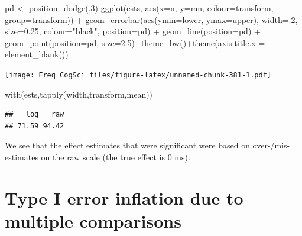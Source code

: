 \documentclass[
  12pt,
]{krantz}
\newenvironment{Shaded}{\begin{snugshade}}{\end{snugshade}}
\newcommand{\AttributeTok}[1]{\textcolor[rgb]{0.77,0.63,0.00}{#1}}
\newcommand{\DecValTok}[1]{\textcolor[rgb]{0.00,0.00,0.81}{#1}}
\newcommand{\FloatTok}[1]{\textcolor[rgb]{0.00,0.00,0.81}{#1}}
\newcommand{\FunctionTok}[1]{\textcolor[rgb]{0.00,0.00,0.00}{#1}}
\newcommand{\NormalTok}[1]{#1}
\newcommand{\OtherTok}[1]{\textcolor[rgb]{0.56,0.35,0.01}{#1}}
\newcommand{\SpecialCharTok}[1]{\textcolor[rgb]{0.00,0.00,0.00}{#1}}
\newcommand{\StringTok}[1]{\textcolor[rgb]{0.31,0.60,0.02}{#1}}
\theoremstyle{definition}
\theoremstyle{definition}
\theoremstyle{definition}
\theoremstyle{definition}
\theoremstyle{remark}
\begin{document}
\begin{Shaded}
\begin{Highlighting}[]
\NormalTok{pd }\OtherTok{\textless{}{-}} \FunctionTok{position\_dodge}\NormalTok{(.}\DecValTok{3}\NormalTok{)}
\FunctionTok{ggplot}\NormalTok{(ests, }\FunctionTok{aes}\NormalTok{(}\AttributeTok{x=}\NormalTok{n, }\AttributeTok{y=}\NormalTok{mn, }\AttributeTok{colour=}\NormalTok{transform, }\AttributeTok{group=}\NormalTok{transform)) }\SpecialCharTok{+} \FunctionTok{geom\_errorbar}\NormalTok{(}\FunctionTok{aes}\NormalTok{(}\AttributeTok{ymin=}\NormalTok{lower, }\AttributeTok{ymax=}\NormalTok{upper),}
\AttributeTok{width=}\NormalTok{.}\DecValTok{2}\NormalTok{, }\AttributeTok{size=}\FloatTok{0.25}\NormalTok{, }\AttributeTok{colour=}\StringTok{"black"}\NormalTok{, }\AttributeTok{position=}\NormalTok{pd) }\SpecialCharTok{+} \FunctionTok{geom\_line}\NormalTok{(}\AttributeTok{position=}\NormalTok{pd) }\SpecialCharTok{+}
\FunctionTok{geom\_point}\NormalTok{(}\AttributeTok{position=}\NormalTok{pd, }\AttributeTok{size=}\FloatTok{2.5}\NormalTok{)}\SpecialCharTok{+}\FunctionTok{theme\_bw}\NormalTok{()}\SpecialCharTok{+}\FunctionTok{theme}\NormalTok{(}\AttributeTok{axis.title.x =} \FunctionTok{element\_blank}\NormalTok{())}
\end{Highlighting}
\end{Shaded}

\texttt{[image: Freq\_CogSci\_files/figure-latex/unnamed-chunk-381-1.pdf]}

\begin{Shaded}
\begin{Highlighting}[]
\FunctionTok{with}\NormalTok{(ests,}\FunctionTok{tapply}\NormalTok{(width,transform,mean))}
\end{Highlighting}
\end{Shaded}

\begin{verbatim}
##   log   raw 
## 71.59 94.42
\end{verbatim}

We see that the effect estimates that were significant were based on over-/mis-estimates on the raw scale (the true effect is 0 ms).

\hypertarget{type-i-error-inflation-due-to-multiple-comparisons}{%
\section{Type I error inflation due to multiple comparisons}\label{type-i-error-inflation-due-to-multiple-comparisons}}
\end{document}
